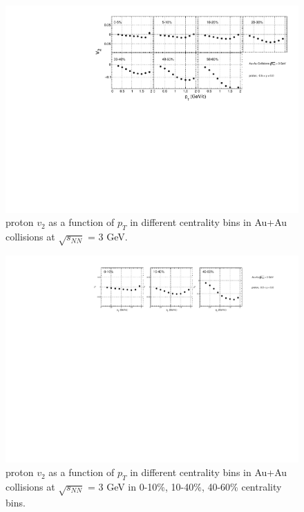 \begin{figure}[h]
\includegraphics[scale=0.6]{chapter3/fig/v2ptpikp/v2pt_cent_proton.pdf}
\caption{proton $v_{2}$ as a function of $p_{T}$ in different centrality bins in Au+Au collisions at $\sqrt{s_{NN}}$ = 3 GeV.}
\label{proton_v2pt_cent}
\end{figure}

\begin{figure}[h]
\includegraphics[scale=0.6]{chapter3/fig/v2ptpikp/protonp_v2pt_wide_cent.pdf}
\caption{proton $v_{2}$ as a function of $p_{T}$ in different centrality bins in Au+Au collisions at $\sqrt{s_{NN}}$ = 3 GeV in 0-10\%, 10-40\%, 40-60\% centrality bins.}
\label{proton_v2pt_widecent}
\end{figure}

\clearpage
\newpage

